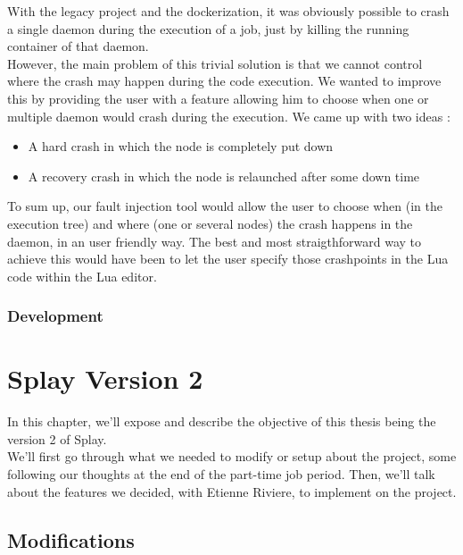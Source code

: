 \documentclass{eplmastersthesis}
\begin{document}
        With the legacy project and the dockerization, it was obviously
        possible to crash a single daemon during the execution of a job, just
        by killing the running container of that daemon.\\
        However, the main problem of this trivial solution is that we cannot
        control where the crash may happen during the code execution.
        We wanted to improve this by providing the user with a feature
        allowing him to choose when one or multiple daemon would crash during
        the execution. We came up with two ideas :

        \begin{itemize}
          \item A hard crash in which the node is completely put down
          \item A recovery crash in which the node is relaunched after some
          down time
        \end{itemize}

        To sum up, our fault injection tool would allow the user to choose
        when (in the execution tree) and where (one or several nodes) the
        crash happens in the daemon, in an user friendly way. The best and
        most straigthforward way to achieve this would have been to let
        the user specify those crashpoints in the Lua code within the Lua
        editor.
      \subsection{Development}

  \chapter{Splay Version 2}

    In this chapter, we'll expose and describe the objective of this thesis
    being the version 2 of Splay.\\

    We'll first go through what we needed to modify or setup about the project,
    some following our thoughts at the end of the part-time job period.
    Then, we'll talk about the features we decided, with Etienne Riviere, to
    implement on the project.

    \section{Modifications} %
\end{document}

